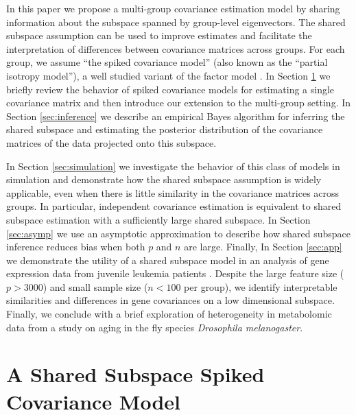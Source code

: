 \documentclass{statsoc}
\begin{document}
In this paper we propose a multi-group covariance estimation model by
sharing information about the subspace spanned by group-level
eigenvectors.  The shared subspace assumption can be used to improve
estimates and facilitate the interpretation of differences between
covariance matrices across groups.  For each group, we assume ``the
spiked covariance model'' (also known as the ``partial isotropy
model''), a well studied variant of the factor model
\citep{Mardia1980, Johnstone2001}.  In Section \ref{sec:shared} we
briefly review the behavior of spiked covariance models for estimating
a single covariance matrix and then introduce our extension to the
multi-group setting.  In Section \ref{sec:inference} we describe an
empirical Bayes algorithm for inferring the shared subspace and
estimating the posterior distribution of the covariance matrices of
the data projected onto this subspace.  

In Section \ref{sec:simulation} we investigate the behavior of this
class of models in simulation and demonstrate how the shared subspace
assumption is widely applicable, even when there is little similarity
in the covariance matrices across groups.  In particular, independent
covariance estimation is equivalent to shared subspace estimation with
a sufficiently large shared subspace.  In Section \ref{sec:asymp} we
use an asymptotic approximation to describe how shared subspace
inference reduces bias when both $p$ and $n$ are large.  Finally, In
Section \ref{sec:app} we demonstrate the utility of a shared subspace
model in an analysis of gene expression data from juvenile leukemia
patients .  Despite the large feature size ($p > 3000$) and small
sample size ($n < 100$ per group), we identify interpretable
similarities and differences in gene covariances on a low dimensional
subspace.  Finally, we conclude with a brief exploration of
heterogeneity in metabolomic data from a study on aging in the fly
species \textit{Drosophila melanogaster}.

\section{A Shared Subspace Spiked Covariance Model}
\label{sec:shared}

\end{document}
